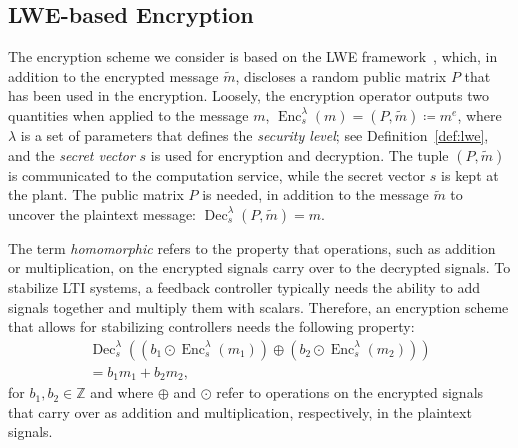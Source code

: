 \documentclass[journal, twoside, web]{ieeecolorpreprint}
\DeclareMathOperator{\enc}{Enc}
\DeclareMathOperator{\dec}{Dec}
\begin{document}


\subsection{LWE-based Encryption}

The encryption scheme we consider is based on the LWE framework~\cite{regev2009}, which, in addition to the encrypted message $\tilde m$, discloses a random public matrix $P$ that has been used in the encryption. Loosely, the encryption operator outputs two quantities when applied to the message $m$, $\enc^\lambda_s(m)=(P, \tilde m)\coloneqq m^e$, where $\lambda$ is a set of parameters that defines the \emph{security level}; see Definition~\ref{def:lwe}, and the \emph{secret vector} $s$ is used for encryption and decryption. The tuple $(P, \tilde m)$ is communicated to the computation service, while the secret vector $s$ is kept at the plant. The public matrix $P$ is needed, in addition to the message $\tilde m$ to uncover the plaintext message: $\dec^\lambda_s(P,\tilde m)=m$.

The term \emph{homomorphic} refers to the property that operations, such as addition or multiplication, on the encrypted signals carry over to the decrypted signals. To stabilize LTI systems, a feedback controller typically needs the ability to add signals together and multiply them with scalars. Therefore, an encryption scheme that allows for stabilizing controllers needs the following property:
\begin{equation}\label{eq:decrypt_homomoprh}
\begin{aligned}
\dec^\lambda_s\left ( \left(b_1 \odot \enc^\lambda_s\left (m_1\right ) \right) \oplus \left (b_2 \odot \enc^\lambda_s \left(m_2\right )\right)  \right) \\ = b_1m_1+b_2m_2,
\end{aligned}
\end{equation}
for $b_1, b_2 \in \mathbb{Z}$ and where $\oplus$ and $\odot$ refer to operations on the encrypted signals that carry over as addition and multiplication, respectively, in the plaintext signals. 
\end{document}
